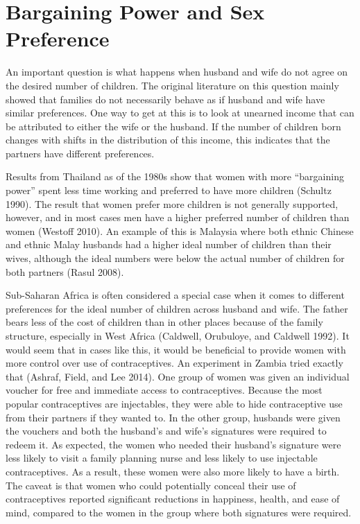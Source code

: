 \documentclass[]{article}
\begin{document}
\section{Bargaining Power and Sex Preference}\label{bargaining-power-and-sex-preference}

An important question is what happens when husband and wife do not agree on the desired number of children. The original literature on this question mainly showed that families do not necessarily behave as if husband and wife have similar preferences. One way to get at this is to look at unearned income that can be attributed to either the wife or the husband. If the number of children born changes with shifts in the distribution of this income, this indicates that the partners have different preferences.

Results from Thailand as of the 1980s show that women with more ``bargaining power'' spent less time working and preferred to have more children (Schultz 1990). The result that women prefer more children is not generally supported, however, and in most cases men have a higher preferred number of children than women (Westoff 2010). An example of this is Malaysia where both ethnic Chinese and ethnic Malay husbands had a higher ideal number of children than their wives, although the ideal numbers were below the actual number of children for both partners (Rasul 2008).

Sub-Saharan Africa is often considered a special case when it comes to different preferences for the ideal number of children across husband and wife. The father bears less of the cost of children than in other places because of the family structure, especially in West Africa (Caldwell, Orubuloye, and Caldwell 1992). It would seem that in cases like this, it would be beneficial to provide women with more control over use of contraceptives. An experiment in Zambia tried exactly that (Ashraf, Field, and Lee 2014). One group of women was given an individual voucher for free and immediate access to contraceptives. Because the most popular contraceptives are injectables, they were able to hide contraceptive use from their partners if they wanted to. In the other group, husbands were given the vouchers and both the husband's and wife's signatures were required to redeem it. As expected, the women who needed their husband's signature were less likely to visit a family planning nurse and less likely to use injectable contraceptives. As a result, these women were also more likely to have a birth. The caveat is that women who could potentially conceal their use of contraceptives reported significant reductions in happiness, health, and ease of mind, compared to the women in the group where both signatures were required.
\end{document}
